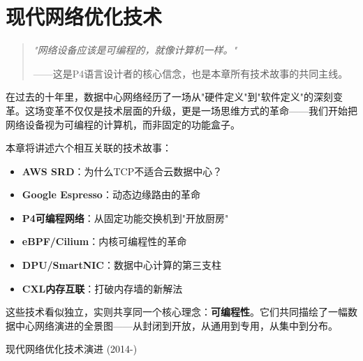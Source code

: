
\section{现代网络优化技术}\label{sec:modern-optimization}

\begin{quote}
\textit{"网络设备应该是可编程的，就像计算机一样。"}

——这是P4语言设计者的核心信念，也是本章所有技术故事的共同主线。
\end{quote}

在过去的十年里，数据中心网络经历了一场从"硬件定义"到"软件定义"的深刻变革。这场变革不仅仅是技术层面的升级，更是一场思维方式的革命——我们开始把网络设备视为可编程的计算机，而非固定的功能盒子。

本章将讲述六个相互关联的技术故事：
\begin{itemize}
    \item \textbf{AWS SRD}：为什么TCP不适合云数据中心？
    \item \textbf{Google Espresso}：动态边缘路由的革命
    \item \textbf{P4可编程网络}：从固定功能交换机到"开放厨房"
    \item \textbf{eBPF/Cilium}：内核可编程性的革命
    \item \textbf{DPU/SmartNIC}：数据中心计算的第三支柱
    \item \textbf{CXL内存互联}：打破内存墙的新解法
\end{itemize}

这些技术看似独立，实则共享同一个核心理念：\textbf{可编程性}。它们共同描绘了一幅数据中心网络演进的全景图——从封闭到开放，从通用到专用，从集中到分布。

\begin{researchtree}{现代网络优化技术演进 (2014-)}
\end{researchtree}

